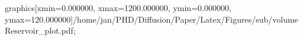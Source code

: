 graphics[xmin=0.000000, xmax=1200.000000, ymin=0.000000, ymax=120.000000]{/home/jan/PHD/Diffusion/Paper/Latex/Figures/sub/volumeReservoir_plot.pdf}; 
